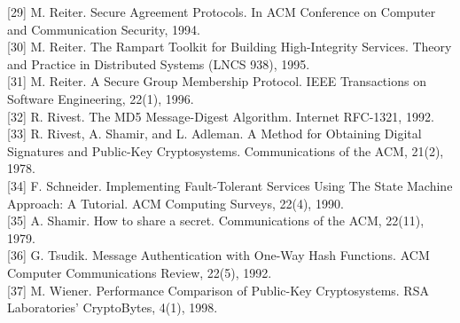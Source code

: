 \documentclass[
]{article}
\begin{document}
{[}29{]} M. Reiter. Secure Agreement Protocols. In ACM Conference on
Computer and Communication Security, 1994.\\
{[}30{]} M. Reiter. The Rampart Toolkit for Building High-Integrity
Services. Theory and Practice in Distributed Systems (LNCS 938), 1995.\\
{[}31{]} M. Reiter. A Secure Group Membership Protocol. IEEE
Transactions on Software Engineering, 22(1), 1996.\\
{[}32{]} R. Rivest. The MD5 Message-Digest Algorithm. Internet RFC-1321,
1992.\\
{[}33{]} R. Rivest, A. Shamir, and L. Adleman. A Method for Obtaining
Digital Signatures and Public-Key Cryptosystems. Communications of the
ACM, 21(2), 1978.\\
{[}34{]} F. Schneider. Implementing Fault-Tolerant Services Using The
State Machine Approach: A Tutorial. ACM Computing Surveys, 22(4),
1990.\\
{[}35{]} A. Shamir. How to share a secret. Communications of the ACM,
22(11), 1979.\\
{[}36{]} G. Tsudik. Message Authentication with One-Way Hash Functions.
ACM Computer Communications Review, 22(5), 1992.\\
{[}37{]} M. Wiener. Performance Comparison of Public-Key Cryptosystems.
RSA Laboratories' CryptoBytes, 4(1), 1998.
\end{document}
